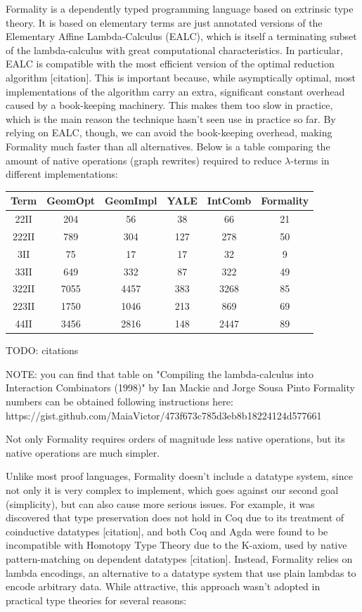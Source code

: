 \documentclass{article}
\theoremstyle{definition}
\theoremstyle{theorem}
\begin{document}
Formality is a dependently typed programming language based on extrinsic type
theory. It is based on elementary terms are just annotated versions of the
Elementary Affine Lambda-Calculus (EALC), which is itself a terminating subset
of the lambda-calculus with great computational characteristics. In particular,
EALC is compatible with the most efficient version of the optimal reduction
algorithm [citation]. This is important because, while asymptically optimal,
most implementations of the algorithm carry an extra, significant constant
overhead caused by a book-keeping machinery. This makes them too slow in
practice, which is the main reason the technique hasn't seen use in practice so
far. By relying on EALC, though, we can avoid the book-keeping overhead, making
Formality much faster than all alternatives. Below is a table comparing the
amount of native operations (graph rewrites) required to reduce $\lambda$-terms
in different implementations:

 \begin{tabular}{ c | c | c | c | c | c}
Term & GeomOpt & GeomImpl & YALE & IntComb & Formality \\\hline
 22II &     204 &       56 &   38 &      66 &        21\\
222II &     789 &      304 &  127 &     278 &        50\\
  3II &      75 &       17 &   17 &      32 &         9\\
 33II &     649 &      332 &   87 &     322 &        49\\
322II &    7055 &     4457 &  383 &    3268 &        85\\
223II &    1750 &     1046 &  213 &     869 &        69\\
 44II &    3456 &     2816 &  148 &    2447 &        89\\
\end{tabular}

TODO: citations 

NOTE: you can find that table on "Compiling the lambda-calculus into
Interaction Combinators (1998)" by Ian Mackie and Jorge Sousa Pinto
Formality numbers can be obtained following instructions here:
https://gist.github.com/MaiaVictor/473f673c785d3eb8b18224124d577661

Not only Formality requires orders of magnitude less native operations, but its
native operations are much simpler.

Unlike most proof languages, Formality doesn't include a datatype system, since
not only it is very complex to implement, which goes against our second goal
(simplicity), but can also cause more serious issues. For example, it was
discovered that type preservation does not hold in Coq due to its treatment of
coinductive datatypes [citation], and both Coq and Agda were found to be
incompatible with Homotopy Type Theory due to the K-axiom, used by native
pattern-matching on dependent datatypes [citation]. Instead, Formality relies on
lambda encodings, an alternative to a datatype system that use plain lambdas to
encode arbitrary data. While attractive, this approach wasn't adopted in
practical type theories for several reasons:
\end{document}
